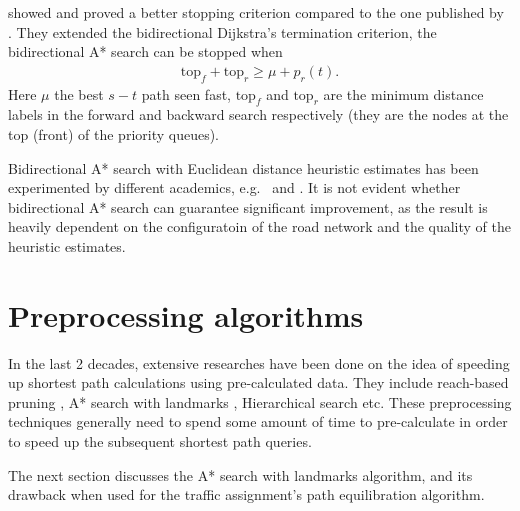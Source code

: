 \citet{GoldbergEPP} showed and proved a better stopping criterion compared to the one published by \citet{Pohl}.
They extended the bidirectional Dijkstra's termination criterion,
the bidirectional A* search can be stopped when
\begin{align}
    \text{top}_f + \text{top}_r \geq \mu + p_r(t).
\end{align}
Here $\mu$ the best $s-t$ path seen fast,
$\text{top}_f$ and $\text{top}_r$ are the minimum distance labels in the forward and backward search respectively (they are the nodes at the top (front) of the priority queues).

Bidirectional A* search with Euclidean distance heuristic estimates has been experimented by different academics, e.g.\ \citet{Klunder} and \citet{Goldberg05}.
It is not evident whether bidirectional A* search can guarantee significant improvement,
as the result is heavily dependent on the configuratoin of the road network and the quality of the heuristic estimates.

\section{Preprocessing algorithms}
In the last 2 decades,
extensive researches have been done on the idea of speeding up shortest path calculations using pre-calculated data.
They include reach-based pruning \citep{Goldberg}, A* search with landmarks \citep{GoldbergLandmarks}, Hierarchical search \citep{Ertl1998, Pearson} etc.
These preprocessing techniques generally need to spend some amount of time to pre-calculate in order to speed up the subsequent shortest path queries.

The next section discusses the A* search with landmarks algorithm,
and its drawback when used for the traffic assignment's path equilibration algorithm.

